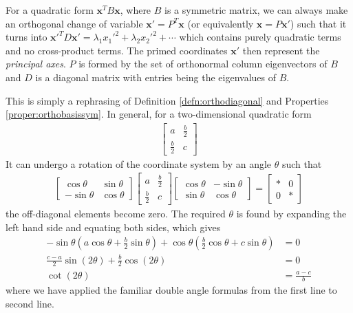 \begin{thm}
For a quadratic form $\textbf{x}^TB\textbf{x}$, where $B$ is a symmetric matrix, we can always make an orthogonal change of variable $\textbf{x}' = P^T\textbf{x}$ (or equivalently $\textbf{x} = P\textbf{x}'$) such that it turns into $\textbf{x}'^TD\textbf{x}' = \lambda_1 x_1'^2 + \lambda_2 x_2'^2 + \cdots$ which contains purely quadratic terms and no cross-product terms. The primed coordinates $\textbf{x}'$ then represent the \textit{principal axes}. $P$ is formed by the set of orthonormal column eigenvectors of $B$ and $D$ is a diagonal matrix with entries being the eigenvalues of $B$.
\end{thm}
This is simply a rephrasing of Definition \ref{defn:orthodiagonal} and Properties \ref{proper:orthobasissym}. In general, for a two-dimensional quadratic form
\begin{align*}
\begin{bmatrix}
a & \frac{b}{2} \\
\frac{b}{2} & c
\end{bmatrix}
\end{align*}
It can undergo a rotation of the coordinate system by an angle $\theta$ such that
\begin{align*}
\begin{bmatrix}
\cos \theta & \sin \theta \\
-\sin \theta & \cos \theta
\end{bmatrix}
\begin{bmatrix}
a & \frac{b}{2} \\
\frac{b}{2} & c
\end{bmatrix}
\begin{bmatrix}
\cos \theta & -\sin \theta \\
\sin \theta & \cos \theta
\end{bmatrix}
=
\begin{bmatrix}
* & 0\\
0 & *
\end{bmatrix}
\end{align*}
the off-diagonal elements become zero. The required $\theta$ is found by expanding the left hand side and equating both sides, which gives
\begin{align*}
-\sin \theta (a \cos\theta + \frac{b}{2}\sin \theta) + \cos\theta (\frac{b}{2} \cos \theta + c\sin \theta) &= 0 \\
\frac{c-a}{2} \sin (2\theta) + \frac{b}{2}\cos(2\theta) &= 0 \\
\cot(2\theta) &= \frac{a-c}{b}
\end{align*}
where we have applied the familiar double angle formulas from the first line to second line.

